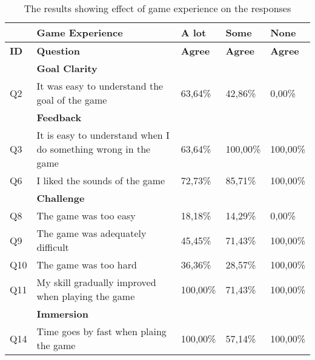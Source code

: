 \begin{table}[ht]
	\centering
	\caption{The results showing effect of game experience on the responses}
	\label{tab:game_experience}
	\begin{tabularx}{\textwidth}{|l|X|l|l|l|}
		\hline
		\textbf{}   & \textbf{Game Experience}                                       & \textbf{A lot} & \textbf{Some}  & \textbf{None}  \\ \hline
		\textbf{ID} & \textbf{Question}                                              & \textbf{Agree} & \textbf{Agree} & \textbf{Agree} \\ \hline
		& \textbf{Goal Clarity}                                          &                &                &                \\ \hline
		Q2          & It was easy to understand the goal of the game                 & 63,64\%        & 42,86\%        & 0,00\%         \\ \hline
		& \textbf{Feedback}                                              &                &                &                \\ \hline
		Q3          & It is easy to understand when I do something wrong in the game & 63,64\%        & 100,00\%       & 100,00\%       \\ \hline
		Q6          & I liked the sounds of the game                                 & 72,73\%        & 85,71\%        & 100,00\%       \\ \hline
		& \textbf{Challenge}                                             &                &                &                \\ \hline
		Q8          & The game was too easy                                          & 18,18\%        & 14,29\%        & 0,00\%         \\ \hline
		Q9          & The game was adequately difficult                              & 45,45\%        & 71,43\%        & 100,00\%       \\ \hline
		Q10         & The game was too hard                                          & 36,36\%        & 28,57\%        & 100,00\%       \\ \hline
		Q11         & My skill gradually improved when playing the game              & 100,00\%       & 71,43\%        & 100,00\%       \\ \hline
		& \textbf{Immersion}                                             &                &                &                \\ \hline
		Q14         & Time goes by fast when plaing the game                         & 100,00\%       & 57,14\%        & 100,00\%       \\ \hline

\end{tabularx}
\end{table}

